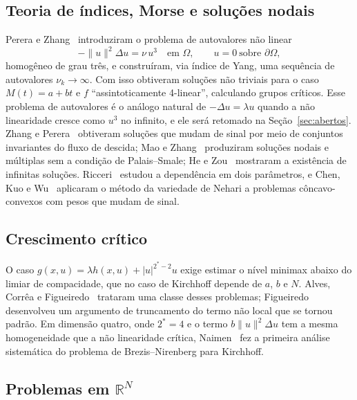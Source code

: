 \documentclass[11pt,a4paper]{article}
\theoremstyle{plain}
\theoremstyle{definition}
\theoremstyle{remark}
\newcommand{\R}{\mathbb{R}}
\newcommand{\norm}[1]{\lVert #1\rVert}
\newcommand{\abs}[1]{\lvert #1\rvert}
\begin{document}
\subsection{Teoria de índices, Morse e soluções nodais}

Perera e Zhang~\cite{PereraZhang2006} introduziram o problema de autovalores
não linear
\begin{equation}\label{eq:autovalor-PZ}
-\norm{u}^2\Delta u=\nu\,u^3\quad\text{em }\Omega,\qquad u=0\ \text{sobre }\partial\Omega,
\end{equation}
homogêneo de grau três, e construíram, via índice de Yang, uma sequência de
autovalores $\nu_k\to\infty$. Com isso obtiveram soluções não triviais para o
caso $M(t)=a+bt$ e $f$ ``assintoticamente 4-linear'', calculando grupos
críticos. Esse problema de autovalores é o análogo natural de
$-\Delta u=\lambda u$ quando a não linearidade cresce como $u^3$ no infinito, e
ele será retomado na Seção~\ref{sec:abertos}. Zhang e
Perera~\cite{ZhangPerera2006} obtiveram soluções que mudam de sinal por meio de
conjuntos invariantes do fluxo de descida; Mao e Zhang~\cite{MaoZhang2009}
produziram soluções nodais e múltiplas sem a condição de Palais--Smale; He e
Zou~\cite{HeZou2009} mostraram a existência de infinitas soluções. Ricceri~\cite{Ricceri2010}
estudou a dependência em dois parâmetros, e Chen, Kuo e Wu~\cite{ChenKuoWu2011}
aplicaram o método da variedade de Nehari a problemas côncavo-convexos com pesos
que mudam de sinal.

\subsection{Crescimento crítico}

O caso $g(x,u)=\lambda h(x,u)+\abs{u}^{2^*-2}u$ exige estimar o nível minimax
abaixo do limiar de compacidade, que no caso de Kirchhoff depende de $a$, $b$
e $N$. Alves, Corrêa e Figueiredo~\cite{AlvesCorreaFigueiredo2010} trataram
uma classe desses problemas; Figueiredo~\cite{Figueiredo2013} desenvolveu um
argumento de truncamento do termo não local que se tornou padrão. Em dimensão
quatro, onde $2^*=4$ e o termo $b\norm{u}^2\Delta u$ tem a mesma homogeneidade
que a não linearidade crítica, Naimen~\cite{Naimen2014} fez a primeira análise
sistemática do problema de Brezis--Nirenberg para Kirchhoff.

\subsection{Problemas em \texorpdfstring{$\R^N$}{RN}}
\end{document}
